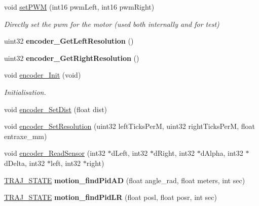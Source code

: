 \begin{DoxyCompactItemize}
void \hyperlink{classAsservInsa_a4d839cdd298a4e24f57b5a298e6f463e}{set\+P\+WM} (int16 pwm\+Left, int16 pwm\+Right)
\begin{DoxyCompactList}\small\item\em Directly set the pwm for the motor (used both internally and for test) \end{DoxyCompactList}\item 
\mbox{\label{classAsservInsa_a6bb59a9796d2339d58c36c53302cf22d}} 
uint32 {\bfseries encoder\+\_\+\+Get\+Left\+Resolution} ()
\item 
\mbox{\label{classAsservInsa_a1bdbdafa3f9edcf8632c13dffb57262a}} 
uint32 {\bfseries encoder\+\_\+\+Get\+Right\+Resolution} ()
\item 
\mbox{\label{classAsservInsa_aa20ca7b484f54748a7fefda97b969a9f}} 
void \hyperlink{classAsservInsa_aa20ca7b484f54748a7fefda97b969a9f}{encoder\+\_\+\+Init} (void)
\begin{DoxyCompactList}\small\item\em Initialisation. \end{DoxyCompactList}\item 
void \hyperlink{classAsservInsa_aca28ee0011e081ee43edc944d9dc67a3}{encoder\+\_\+\+Set\+Dist} (float dist)
\item 
void \hyperlink{classAsservInsa_a4b5dca46085bb5f955a71f5edc8374f2}{encoder\+\_\+\+Set\+Resolution} (uint32 left\+Ticks\+PerM, uint32 right\+Ticks\+PerM, float entraxe\+\_\+mm)
\item 
void \hyperlink{classAsservInsa_a76cc56c8240ee5f95dd15f4d3097f9a7}{encoder\+\_\+\+Read\+Sensor} (int32 $\ast$d\+Left, int32 $\ast$d\+Right, int32 $\ast$d\+Alpha, int32 $\ast$d\+Delta, int32 $\ast$left, int32 $\ast$right)
\item 
\mbox{\label{classAsservInsa_a6119d026aea3bd10b93a7e5443a8c764}} 
\hyperlink{path__manager_8h_adb3360abeb29758da93865c8afcb80eb}{T\+R\+A\+J\+\_\+\+S\+T\+A\+TE} {\bfseries motion\+\_\+find\+Pid\+AD} (float angle\+\_\+rad, float meters, int sec)
\item 
\mbox{\label{classAsservInsa_aa5cfee544774789548c1033627e2081e}} 
\hyperlink{path__manager_8h_adb3360abeb29758da93865c8afcb80eb}{T\+R\+A\+J\+\_\+\+S\+T\+A\+TE} {\bfseries motion\+\_\+find\+Pid\+LR} (float posl, float posr, int sec)

\end{DoxyCompactItemize}

